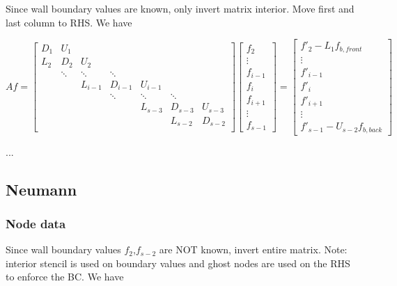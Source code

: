 \documentclass[11pt]{article}
\begin{document}
Since wall boundary values are known, only invert matrix interior. Move first and last column to RHS. We have

\[ Af = \left[
\begin{array}{ccccccccc}
D_{1} & U_{1}    &           &           &           &           &         \\
L_{2} & D_{2}    & U_{2}     &           &           &           &         \\
      & \ddots   & \ddots    & \ddots    &           &           &         \\
      &          & L_{i-1}   & D_{i-1}   & U_{i-1}   &           &         \\
      &          &           & \ddots    & \ddots    & \ddots    &         \\
      &          &           &           & L_{s-3}   & D_{s-3}   & U_{s-3} \\
      &          &           &           &           & L_{s-2}   & D_{s-2} \\
\end{array} \right]
\left[ \begin{array}{c}
f_{2} \\ \vdots \\ f_{i-1} \\ f_{i} \\ f_{i+1} \\ \vdots \\ f_{s-1}
\end{array} \right]
=
\left[ \begin{array}{c}
f'_{2} - L_1 f_{b,front} \\ \vdots \\
f'_{i-1} \\ f'_{i} \\ f'_{i+1} \\ \vdots \\ f'_{s-1} - U_{s-2} f_{b,back}
\end{array} \right]
\]

...


\subsection{Neumann}

\subsubsection{Node data}

Since wall boundary values $f_2$,$f_{s-2}$ are NOT known, invert entire matrix. Note: interior stencil is used on boundary values and ghost nodes are used on the RHS to enforce the BC. We have
\end{document}
